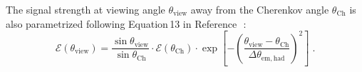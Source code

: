 The signal strength at viewing angle $\theta_{\mathrm{view}}$ 
away from the Cherenkov angle $\theta_{\mathrm{Ch}}$ is also parametrized following
Equation\,13 in Reference\,~\cite{jaime05}:
\begin{equation}
\mathcal{E}(\theta_{\mathrm{view}})=\frac{\sin{\theta_{\mathrm{view}}}}{\sin{\theta_{\mathrm{Ch}}}} \cdot
\mathcal{E}(\theta_{\mathrm{Ch}})\cdot \exp\left[-\left(
    \frac{\theta_{\mathrm{view}}-\theta_{\mathrm{Ch}}}{\Delta\theta_{\mathrm{em,had}}} \right)^2
\right] \;.
\end{equation}




